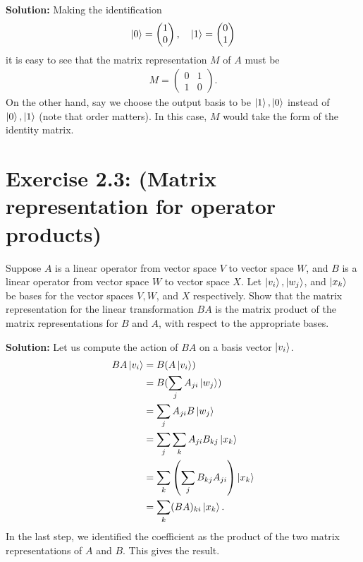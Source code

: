 \documentclass{book}
\begin{document}
    \textbf{Solution:} Making the identification
    \begin{align}
    \ket{0} =
    \begin{pmatrix}
        1 \\
        0
    \end{pmatrix}, \quad
    \ket{1} =
    \begin{pmatrix}
        0 \\
        1
    \end{pmatrix}
    \end{align}
    it is easy to see that the matrix representation $M$ of $A$ must be 
    \begin{align}
        M = 
        \begin{pmatrix}
            0 & 1 \\
            1 & 0
        \end{pmatrix}.
    \end{align}
    On the other hand, say we choose the output basis to be $\ket{1},\ket{0}$ instead of $\ket{0},\ket{1}$ (note that order matters). In this case, $M$ would take the form of the identity matrix.

\section*{Exercise 2.3: (Matrix representation for operator products)}
    Suppose $A$ is a linear operator from vector space $V$ to vector space $W$, and $B$ is a linear operator from vector space $W$ to vector space $X$. Let $\ket{v_i}, \ket{w_j}$, and $\ket{x_k}$ be bases for the vector spaces $V, W$, and $X$ respectively. Show that the matrix representation for the linear transformation $BA$ is the matrix product of the matrix representations for $B$ and $A$, with respect to the appropriate bases.
    
    \textbf{Solution:} Let us compute the action of $BA$ on a basis vector $\ket{v_i}$.
    \begin{align}
    \begin{aligned}
        BA\ket{v_i} &= B(A\ket{v_i}) \\
        &= B(\sum_j A_{ji}\ket{w_j}) \\
        &= \sum_j A_{ji}B\ket{w_j} \\
        &= \sum_j\sum_k A_{ji}B_{kj}\ket{x_k} \\
        &= \sum_k \left(\sum_j B_{kj}A_{ji}\right) \ket{x_k} \\
        &= \sum_k (BA)_{ki} \ket{x_k}.
    \end{aligned}
    \end{align}
    In the last step, we identified the coefficient as the product of the two matrix representations of $A$ and $B$. This gives the result.
    
\end{document}
